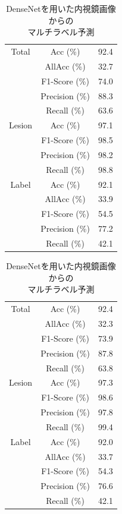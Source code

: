 \begin{table}[tb]
    \caption[]{DenseNetを用いた内視鏡画像からの\\マルチラベル予測}
    \label{tb:densenet121}
    \centering
    \normalsize
    \begin{tabular}{c|c|r} \hline
        Total & Acc (\%) & 92.4 \\ \cline{2-3}
         & AllAcc (\%) & 32.7 \\ \cline{2-3}
         & F1-Score (\%) & 74.0 \\ \cline{2-3}
         & Precision (\%) & 88.3 \\ \cline{2-3}
         & Recall (\%) & 63.6 \\ \hline
        Lesion & Acc (\%) & 97.1 \\ \cline{2-3}
         & F1-Score (\%) & 98.5 \\ \cline{2-3}
         & Precision (\%) & 98.2 \\ \cline{2-3}
         & Recall (\%) & 98.8 \\ \hline
        Label & Acc (\%) & 92.1 \\ \cline{2-3}
         & AllAcc (\%) & 33.9 \\ \cline{2-3}
         & F1-Score (\%) & 54.5 \\ \cline{2-3}
         & Precision (\%) & 77.2 \\ \cline{2-3}
         & Recall (\%) & 42.1 \\ \hline
    \end{tabular}
\end{table}

\begin{table}[tb]
    \caption[]{DenseNetを用いた内視鏡画像からの\\マルチラベル予測}
    \label{tb:densenet161}
    \centering
    \normalsize
    \begin{tabular}{c|c|r} \hline
        Total & Acc (\%) & 92.4 \\ \cline{2-3}
         & AllAcc (\%) & 32.3 \\ \cline{2-3}
         & F1-Score (\%) & 73.9 \\ \cline{2-3}
         & Precision (\%) & 87.8 \\ \cline{2-3}
         & Recall (\%) & 63.8 \\ \hline
        Lesion & Acc (\%) & 97.3 \\ \cline{2-3}
         & F1-Score (\%) & 98.6 \\ \cline{2-3}
         & Precision (\%) & 97.8 \\ \cline{2-3}
         & Recall (\%) & 99.4 \\ \hline
        Label & Acc (\%) & 92.0 \\ \cline{2-3}
         & AllAcc (\%) & 33.7 \\ \cline{2-3}
         & F1-Score (\%) & 54.3 \\ \cline{2-3}
         & Precision (\%) & 76.6 \\ \cline{2-3}
         & Recall (\%) & 42.1 \\ \hline
    \end{tabular}
\end{table}


